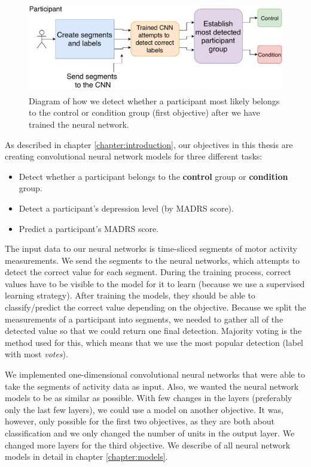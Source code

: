 \begin{figure}[h]
  \begin{center}
      \includegraphics[height=4cm]{img/flow_detection.pdf}
      \caption{Diagram of how we detect whether a participant most likely belongs to the control or condition group (first objective) after we have trained the neural network. }
      \label{figure:flow}
  \end{center}
\end{figure}

As described in chapter \ref{chapter:introduction}, our objectives in this thesis are creating convolutional neural network models for three different tasks:

\begin{itemize}
  \item Detect whether a participant belongs to the \textbf{control} group or \textbf{condition} group.
  \item Detect a participant's depression level (by MADRS score).
  \item Predict a participant's MADRS score.
\end{itemize}

The input data to our neural networks is time-sliced segments of motor activity measurements. We send the segments to the neural networks, which attempts to detect the correct value for each segment. During the training process, correct values have to be visible to the model for it to learn (because we use a supervised learning strategy). After training the models, they should be able to classify/predict the correct value depending on the objective. Because we split the measurements of a participant into segments, we needed to gather all of the detected value so that we could return one final detection. Majority voting is the method used for this, which means that we use the most popular detection (label with most \textit{votes}). 

We implemented one-dimensional convolutional neural networks that were able to take the segments of activity data as input. Also, we wanted the neural network models to be as similar as possible. With few changes in the layers (preferably only the last few layers), we could use a model on another objective. It was, however, only possible for the first two objectives, as they are both about classification and we only changed the number of units in the output layer. We changed more layers for the third objective. We describe of all neural network models in detail in chapter \ref{chapter:models}.

